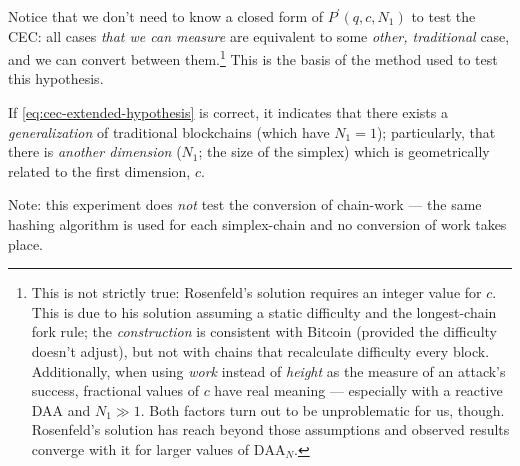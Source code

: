 Notice that we don't need to know a closed form of $P^\prime(q, c, N_1)$ to test the CEC: all cases \emph{that we can measure} are equivalent to some \emph{other, traditional} case, and we can convert between them.\footnote{
    This is not strictly true: Rosenfeld's solution requires an integer value for $c$.
    This is due to his solution assuming a static difficulty and the longest-chain fork rule; the \emph{construction} is consistent with Bitcoin (provided the difficulty doesn't adjust), but not with chains that recalculate difficulty every block.
    Additionally, when using \emph{work} instead of \emph{height} as the measure of an attack's success, fractional values of $c$ have real meaning --- especially with a reactive DAA and $N_1 \gg 1$.
    Both factors turn out to be unproblematic for us, though.
    Rosenfeld's solution has reach beyond those assumptions and observed results converge with it for larger values of $\text{DAA}_N$.
}
This is the basis of the method used to test this hypothesis.

If \autoref{eq:cec-extended-hypothesis} is correct, it indicates that there exists a \emph{generalization} of traditional blockchains (which have $N_1 = 1$);
particularly, that there is \emph{another dimension} ($N_1$; the size of the simplex) which is geometrically related to the first dimension, $c$.

Note: this experiment does \emph{not} test the conversion of chain-work --- the same hashing algorithm is used for each simplex-chain and no conversion of work takes place.








